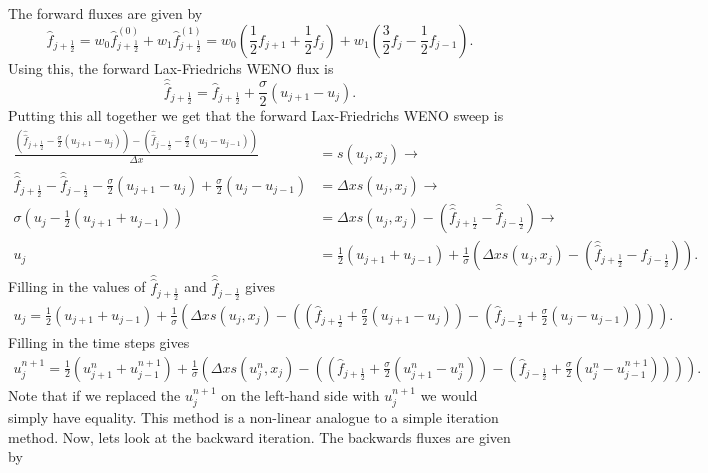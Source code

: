 \documentclass{article}
\def\^{\hat}
\def\l{\left}
\def\r{\right}
\begin{document}
\noindent The forward fluxes are given by
\begin{equation}\label{eq:f_hat1}
    \^ f_{j + \frac{1}{2}} = w_0 \^ f_{j + \frac{1}{2}}^{(0)} +  w_1 \^ f_{j + \frac{1}{2}}^{(1)} = w_0 \l(\frac{1}{2} f_{j+1} + \frac{1}{2} f_j\r) +  w_1 \l(\frac{3}{2} f_j - \frac{1}{2} f_{j-1}\r).
\end{equation}
Using this, the forward Lax-Friedrichs WENO flux is
\begin{equation*}
    \^{\^{f}}_{j + \frac{1}{2}} = \^f_{j + \frac{1}{2}} + \frac{\sigma}{2}(u_{j+1} - u_j).
\end{equation*}
Putting this all together we get that the forward Lax-Friedrichs WENO sweep is
\begin{align*}
    \frac{(\^{\^{f}}_{j + \frac{1}{2}} - \frac{\sigma}{2}(u_{j+1} - u_j)) - (\^{\^{f}}_{j - \frac{1}{2}} - \frac{\sigma}{2}(u_{j} - u_{j-1}))}{\Delta x} &= s(u_j,x_j) \to \\
    \^{\^{f}}_{j + \frac{1}{2}} - \^{\^{f}}_{j - \frac{1}{2}} - \frac{\sigma}{2}(u_{j+1} - u_j) + \frac{\sigma}{2}(u_{j} - u_{j-1}) &= \Delta x s(u_j,x_j) \to \\
     \sigma (u_{j} - \frac{1}{2}(u_{j+1} + u_{j-1})) &= \Delta x s(u_j,x_j) - (\^{\^{f}}_{j + \frac{1}{2}} - \^{\^{f}}_{j - \frac{1}{2}}) \to \\
     u_{j} &= \frac{1}{2}(u_{j+1} + u_{j-1}) + \frac{1}{\sigma}(\Delta x s(u_j,x_j) - (\^{\^{f}}_{j + \frac{1}{2}} - \^{\^{f}}_{j - \frac{1}{2}})).
\end{align*}
Filling in the values of $\^{\^{f}}_{j + \frac{1}{2}}$ and $\^{\^{f}}_{j - \frac{1}{2}}$ gives
\begin{align*}    
     u_{j} = \frac{1}{2}(u_{j+1} + u_{j-1}) + \frac{1}{\sigma}(\Delta x s(u_j,x_j) - ((\^f_{j + \frac{1}{2}} + \frac{\sigma}{2}(u_{j+1} - u_j)) -  (\^f_{j - \frac{1}{2}} + \frac{\sigma}{2}(u_{j} - u_{j-1})))).
\end{align*}
Filling in the time steps gives
\begin{align*}    
    u^{n+1}_{j} = \frac{1}{2}(u^n_{j+1} + u^{n+1}_{j-1}) + \frac{1}{\sigma}(\Delta x s(u^n_j,x_j) - ((\^f_{j + \frac{1}{2}} + \frac{\sigma}{2}(u^n_{j+1} - u^n_j)) -  (\^f_{j - \frac{1}{2}} + \frac{\sigma}{2}(u^n_{j} - u^{n+1}_{j-1})))).
\end{align*}
Note that if we replaced the $u^{n+1}_{j}$ on the left-hand side with $u^{n+1}_{j}$ we would simply have equality. This method is a non-linear analogue to a simple iteration method. Now, lets look at the backward iteration. The backwards fluxes are given by 
\end{document}
